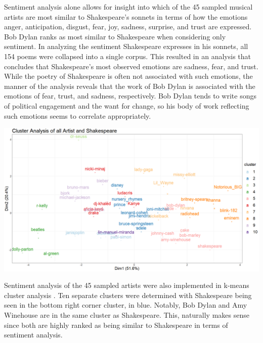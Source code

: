 \documentclass[10pt,a4paper]{article}
\begin{document}
  

\noindent Sentiment analysis alone allows for insight into which of the 45 sampled musical artists are most similar to Shakespeare’s sonnets in terms of how the emotions anger, anticipation, disgust, fear, joy, sadness, surprise, and trust are expressed. Bob Dylan ranks as most similar to Shakespeare when considering only sentiment. In analyzing the sentiment Shakespeare expresses in his sonnets, all 154 poems were collapsed into a single corpus. This resulted in an analysis that concludes that Shakespeare’s most observed emotions are sadness, fear, and trust. While the poetry of Shakespeare is often not associated with such emotions, the manner of the analysis reveals that the work of Bob Dylan is associated with the emotions of fear, trust, and sadness, respectively. Bob Dylan tends to write songs of political engagement and the want for change, so his body of work reflecting such emotions seems to correlate appropriately. 

\begin{center}
\includegraphics[width=14cm]{_assets/ClusterAnalysis_Fit10.png}
\end{center}

\noindent Sentiment analysis of the 45 sampled artists were also implemented in k-means cluster analysis . Ten separate clusters were determined with Shakespeare being seen in the bottom right corner cluster, in blue. Notably, Bob Dylan and Amy Winehouse are in the same cluster as Shakespeare. This, naturally makes sense since both are highly ranked as being similar to Shakespeare in terms of sentiment analysis. 
\end{document}
